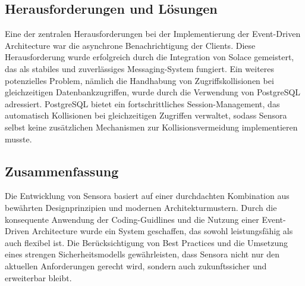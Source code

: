 \subsection{Herausforderungen und Lösungen}
Eine der zentralen Herausforderungen bei der Implementierung der Event-Driven Architecture war die asynchrone Benachrichtigung der Clients. Diese Herausforderung wurde erfolgreich durch die Integration von Solace gemeistert, das als stabiles und zuverlässiges Messaging-System fungiert. Ein weiteres potenzielles Problem, nämlich die Handhabung von Zugriffskollisionen bei gleichzeitigen Datenbankzugriffen, wurde durch die Verwendung von PostgreSQL adressiert. PostgreSQL bietet ein fortschrittliches Session-Management, das automatisch Kollisionen bei gleichzeitigen Zugriffen verwaltet, sodass Sensora selbst keine zusätzlichen Mechanismen zur Kollisionsvermeidung implementieren musste.

\subsection{Zusammenfassung}
Die Entwicklung von Sensora basiert auf einer durchdachten Kombination aus bewährten Designprinzipien und modernen Architekturmustern. Durch die konsequente Anwendung der Coding-Guidlines und die Nutzung einer Event-Driven Architecture wurde ein System geschaffen, das sowohl leistungsfähig als auch flexibel ist. Die Berücksichtigung von Best Practices und die Umsetzung eines strengen Sicherheitsmodells gewährleisten, dass Sensora nicht nur den aktuellen Anforderungen gerecht wird, sondern auch zukunftssicher und erweiterbar bleibt.
